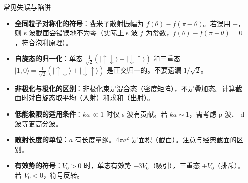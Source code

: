 \begin{errorbox}{常见失误与陷阱}
\begin{itemize}
    \item \textbf{全同粒子对称化的符号}：费米子散射振幅为 $f(\theta)-f(\pi-\theta)$。若误用 $+$，则 s 波截面会错误地不为零（实际上 s 波 $f$ 为常数，$f(\theta)-f(\pi-\theta)=0$，符合泡利原理）。
    \item \textbf{自旋态的归一化}：单态 $\frac{1}{\sqrt2}(|\uparrow\downarrow\rangle-|\downarrow\uparrow\rangle)$ 和三重态 $|1,0\rangle=\frac{1}{\sqrt2}(|\uparrow\downarrow\rangle+|\downarrow\uparrow\rangle)$ 是正交归一的。不要遗漏 $1/\sqrt2$。
    \item \textbf{非极化与极化的区别}：非极化束是混合态（密度矩阵），不是叠加态。计算截面时对自旋态取平均（入射）和求和（出射）。
    \item \textbf{低能极限的适用条件}：$ka\ll1$ 时仅 s 波有贡献。若 $ka\sim1$，需考虑 p 波、 d 波等更高分波。
    \item \textbf{散射长度的单位}：$a$ 有长度量纲。$4\pi a^2$ 是面积（截面）。注意与经典截面的区别。
    \item \textbf{有效势的符号}：$V_0>0$ 时，单态有效势 $-3V_0$（吸引），三重态 $+V_0$（排斥）。若 $V_0<0$，符号反转。
\end{itemize}
\end{errorbox}

